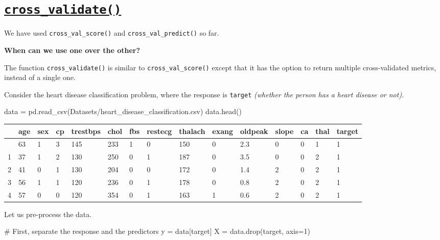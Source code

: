 \documentclass[
  letterpaper,
  DIV=11,
  numbers=noendperiod]{scrreprt}
\newenvironment{Shaded}{\begin{snugshade}}{\end{snugshade}}
\newcommand{\CommentTok}[1]{\textcolor[rgb]{0.37,0.37,0.37}{#1}}
\newcommand{\DecValTok}[1]{\textcolor[rgb]{0.68,0.00,0.00}{#1}}
\newcommand{\NormalTok}[1]{\textcolor[rgb]{0.00,0.23,0.31}{#1}}
\newcommand{\OperatorTok}[1]{\textcolor[rgb]{0.37,0.37,0.37}{#1}}
\newcommand{\StringTok}[1]{\textcolor[rgb]{0.13,0.47,0.30}{#1}}
\begin{document}
\section{\texorpdfstring{\href{https://scikit-learn.org/stable/modules/generated/sklearn.model_selection.cross_validate.html}{\texttt{cross\_validate()}}}{cross\_validate()}}\label{cross_validate}

We have used \texttt{cross\_val\_score()} and
\texttt{cross\_val\_predict()} so far.

\textbf{When can we use one over the other?}

The function \texttt{cross\_validate()} is similar to
\texttt{cross\_val\_score()} except that it has the option to return
multiple cross-validated metrics, instead of a single one.

Consider the heart disease classification problem, where the response is
\texttt{target} \emph{(whether the person has a heart disease or not)}.

\begin{Shaded}
\begin{Highlighting}[]
\NormalTok{data }\OperatorTok{=}\NormalTok{ pd.read\_csv(}\StringTok{\textquotesingle{}Datasets/heart\_disease\_classification.csv\textquotesingle{}}\NormalTok{)}
\NormalTok{data.head()}
\end{Highlighting}
\end{Shaded}

\begin{longtable}[]{@{}lllllllllllllll@{}}
\toprule\noalign{}
& age & sex & cp & trestbps & chol & fbs & restecg & thalach & exang &
oldpeak & slope & ca & thal & target \\
\midrule\noalign{}
\endhead
\bottomrule\noalign{}
\endlastfoot
0 & 63 & 1 & 3 & 145 & 233 & 1 & 0 & 150 & 0 & 2.3 & 0 & 0 & 1 & 1 \\
1 & 37 & 1 & 2 & 130 & 250 & 0 & 1 & 187 & 0 & 3.5 & 0 & 0 & 2 & 1 \\
2 & 41 & 0 & 1 & 130 & 204 & 0 & 0 & 172 & 0 & 1.4 & 2 & 0 & 2 & 1 \\
3 & 56 & 1 & 1 & 120 & 236 & 0 & 1 & 178 & 0 & 0.8 & 2 & 0 & 2 & 1 \\
4 & 57 & 0 & 0 & 120 & 354 & 0 & 1 & 163 & 1 & 0.6 & 2 & 0 & 2 & 1 \\
\end{longtable}

Let us pre-process the data.

\begin{Shaded}
\begin{Highlighting}[]
\CommentTok{\# First, separate the response and the predictors}
\NormalTok{y }\OperatorTok{=}\NormalTok{ data[}\StringTok{\textquotesingle{}target\textquotesingle{}}\NormalTok{]}
\NormalTok{X }\OperatorTok{=}\NormalTok{ data.drop(}\StringTok{\textquotesingle{}target\textquotesingle{}}\NormalTok{, axis}\OperatorTok{=}\DecValTok{1}\NormalTok{)}
\end{Highlighting}
\end{Shaded}
\end{document}
